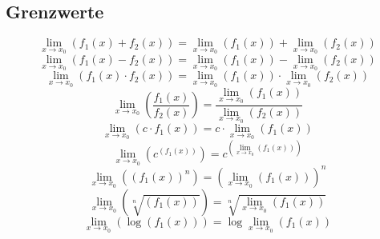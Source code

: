 \subsection{Grenzwerte}
\[ \boxed{\lim\limits_{x \to x_0}(f_1(x) + f_2(x)) = \lim\limits_{x \to x_0}(f_1(x)) + \lim\limits_{x \to x_0}(f_2(x))} \]
\[ \boxed{\lim\limits_{x \to x_0}(f_1(x) - f_2(x)) = \lim\limits_{x \to x_0}(f_1(x)) - \lim\limits_{x \to x_0}(f_2(x))} \]
\[ \boxed{\lim\limits_{x \to x_0}(f_1(x) \cdot f_2(x)) = \lim\limits_{x \to x_0}(f_1(x)) \cdot \lim\limits_{x \to x_0}(f_2(x))} \]
\[ \boxed{\lim\limits_{x \to x_0}\left(\frac{f_1(x)}{f_2(x)}\right) = \frac{\lim\limits_{x \to x_0}(f_1(x))}{\lim\limits_{x \to x_0}(f_2(x))}} \]
\[ \boxed{\lim\limits_{x \to x_0}(c \cdot f_1(x)) = c \cdot \lim\limits_{x \to x_0}(f_1(x))} \]
\[ \boxed{\lim\limits_{x \to x_0}\left(c^{(f_1(x))}\right) = c^{\left(\lim\limits_{x \to x_0}(f_1(x))\right)}} \]
\[ \boxed{\lim\limits_{x \to x_0}\left((f_1(x))^n\right) = \left(\lim\limits_{x \to x_0}(f_1(x))\right)^n} \]
\[ \boxed{\lim\limits_{x \to x_0}\left(\sqrt[n]{(f_1(x))}\right) = \sqrt[n]{\lim\limits_{x \to x_0}(f_1(x))}} \]
\[ \boxed{\lim\limits_{x \to x_0}\left(\log{(f_1(x))}\right) = \log{\lim\limits_{x \to x_0}(f_1(x))}} \]

